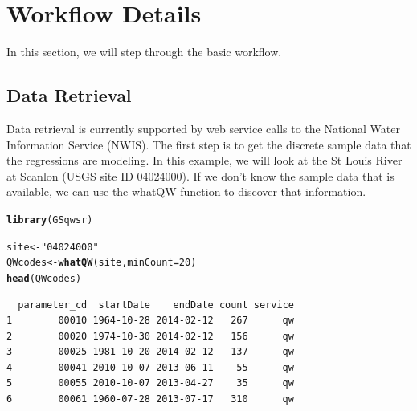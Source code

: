 \documentclass[a4paper,11pt]{article}\usepackage[]{graphicx}\usepackage[]{color}
\makeatletter
\newcommand{\hlnum}[1]{\textcolor[rgb]{0.686,0.059,0.569}{#1}}%
\newcommand{\hlstr}[1]{\textcolor[rgb]{0.192,0.494,0.8}{#1}}%
\newcommand{\hlstd}[1]{\textcolor[rgb]{0.345,0.345,0.345}{#1}}%
\newcommand{\hlkwb}[1]{\textcolor[rgb]{0.69,0.353,0.396}{#1}}%
\newcommand{\hlkwc}[1]{\textcolor[rgb]{0.333,0.667,0.333}{#1}}%
\newcommand{\hlkwd}[1]{\textcolor[rgb]{0.737,0.353,0.396}{\textbf{#1}}}%
\newenvironment{kframe}{%
 \def\at@end@of@kframe{}%
 \ifinner\ifhmode%
  \def\at@end@of@kframe{\end{minipage}}%
  \begin{minipage}{\columnwidth}%
 \fi\fi%
 \def\FrameCommand##1{\hskip\@totalleftmargin \hskip-\fboxsep
 \colorbox{shadecolor}{##1}\hskip-\fboxsep
     \hskip-\linewidth \hskip-\@totalleftmargin \hskip\columnwidth}%
 \MakeFramed {\advance\hsize-\width
   \@totalleftmargin\z@ \linewidth\hsize
   \@setminipage}}%
 {\par\unskip\endMakeFramed%
 \at@end@of@kframe}
\newenvironment{knitrout}{}{} %
\makeatother
\begin{document}
\section{Workflow Details}
\label{sec:details}
In this section, we will step through the basic workflow.

\subsection{Data Retrieval}
Data retrieval is currently supported by web service calls to the National Water Information Service (NWIS). The first step is to get the discrete sample data that the regressions are modeling. In this example, we will look at the St Louis River at Scanlon (USGS site ID 04024000). If we don't know the sample data that is available, we can use the whatQW function to discover that information. 

\begin{knitrout}
\color{fgcolor}\begin{kframe}
\begin{alltt}
\hlkwd{library}\hlstd{(GSqwsr)}
\end{alltt}
\end{kframe}
\end{knitrout}






\begin{knitrout}
\color{fgcolor}\begin{kframe}
\begin{alltt}
\hlstd{site} \hlkwb{<-} \hlstr{"04024000"}
\hlstd{QWcodes} \hlkwb{<-} \hlkwd{whatQW}\hlstd{(site,} \hlkwc{minCount}\hlstd{=}\hlnum{20}\hlstd{)}
\hlkwd{head}\hlstd{(QWcodes)}
\end{alltt}
\begin{verbatim}
  parameter_cd  startDate    endDate count service
1        00010 1964-10-28 2014-02-12   267      qw
2        00020 1974-10-30 2014-02-12   156      qw
3        00025 1981-10-20 2014-02-12   137      qw
4        00041 2010-10-07 2013-06-11    55      qw
5        00055 2010-10-07 2013-04-27    35      qw
6        00061 1960-07-28 2013-07-17   310      qw
\end{verbatim}
\end{kframe}
\end{knitrout}
\end{document}
